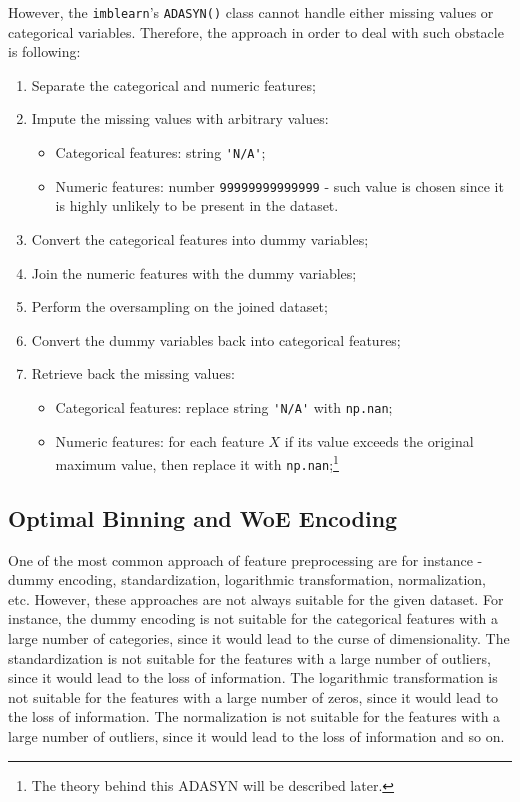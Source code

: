 However, the \lstinline{imblearn}'s \lstinline{ADASYN()} class cannot handle either missing values or categorical variables. Therefore, the approach in order to deal with such obstacle is following:
\begin{enumerate}\setlength\itemsep{0em}
    \item Separate the categorical and numeric features;
    \item Impute the missing values with arbitrary values:
    \begin{itemize}\setlength\itemsep{0em}
        \item Categorical features: string \lstinline{'N/A'};
        \item Numeric features: number \lstinline{99999999999999} - such value is chosen since it is highly unlikely to be present in the dataset.
    \end{itemize}
    \item Convert the categorical features into dummy variables;
    \item Join the numeric features with the dummy variables;
    \item Perform the oversampling on the joined dataset;
    \item Convert the dummy variables back into categorical features;
    \item Retrieve back the missing values:
    \begin{itemize}\setlength\itemsep{0em}
        \item Categorical features: replace string \lstinline{'N/A'} with \lstinline{np.nan};
        \item Numeric features: for each feature $X$ if its value exceeds the original maximum value, then replace it with \lstinline{np.nan};\footnote{The theory behind this ADASYN will be described later.}
    \end{itemize}
\end{enumerate}

\subsection{Optimal Binning and WoE Encoding}
\label{subsec:prep-optbinning}

One of the most common approach of feature preprocessing are for instance - dummy encoding, standardization, logarithmic transformation, normalization, etc.
However, these approaches are not always suitable for the given dataset. For instance, the dummy encoding is not suitable for the categorical features with a large number of categories, since it would lead to the curse of dimensionality. The standardization is not suitable for the features with a large number of outliers, since it would lead to the loss of information.
The logarithmic transformation is not suitable for the features with a large number of zeros, since it would lead to the loss of information. The normalization is not suitable for the features with a large number of outliers, since it would lead to the loss of information and so on.

